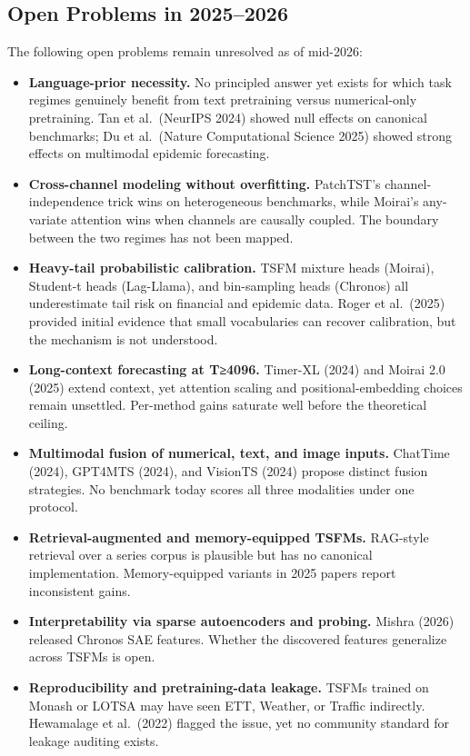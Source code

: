 \subsection{Open Problems in 2025--2026}\label{open-problems-in-20252026}

The following open problems remain unresolved as of mid-2026:

\begin{itemize}
\tightlist
\item
  \textbf{Language-prior necessity.} No principled answer yet exists for which task regimes genuinely benefit from text pretraining versus numerical-only pretraining. Tan et al.~(NeurIPS 2024) showed null effects on canonical benchmarks; Du et al.~(Nature Computational Science 2025) showed strong effects on multimodal epidemic forecasting.
\item
  \textbf{Cross-channel modeling without overfitting.} PatchTST's channel-independence trick wins on heterogeneous benchmarks, while Moirai's any-variate attention wins when channels are causally coupled. The boundary between the two regimes has not been mapped.
\item
  \textbf{Heavy-tail probabilistic calibration.} TSFM mixture heads (Moirai), Student-t heads (Lag-Llama), and bin-sampling heads (Chronos) all underestimate tail risk on financial and epidemic data. Roger et al.~(2025) provided initial evidence that small vocabularies can recover calibration, but the mechanism is not understood.
\item
  \textbf{Long-context forecasting at T≥4096.} Timer-XL (2024) and Moirai 2.0 (2025) extend context, yet attention scaling and positional-embedding choices remain unsettled. Per-method gains saturate well before the theoretical ceiling.
\item
  \textbf{Multimodal fusion of numerical, text, and image inputs.} ChatTime (2024), GPT4MTS (2024), and VisionTS (2024) propose distinct fusion strategies. No benchmark today scores all three modalities under one protocol.
\item
  \textbf{Retrieval-augmented and memory-equipped TSFMs.} RAG-style retrieval over a series corpus is plausible but has no canonical implementation. Memory-equipped variants in 2025 papers report inconsistent gains.
\item
  \textbf{Interpretability via sparse autoencoders and probing.} Mishra (2026) released Chronos SAE features. Whether the discovered features generalize across TSFMs is open.
\item
  \textbf{Reproducibility and pretraining-data leakage.} TSFMs trained on Monash or LOTSA may have seen ETT, Weather, or Traffic indirectly. Hewamalage et al.~(2022) flagged the issue, yet no community standard for leakage auditing exists.
\end{itemize}

